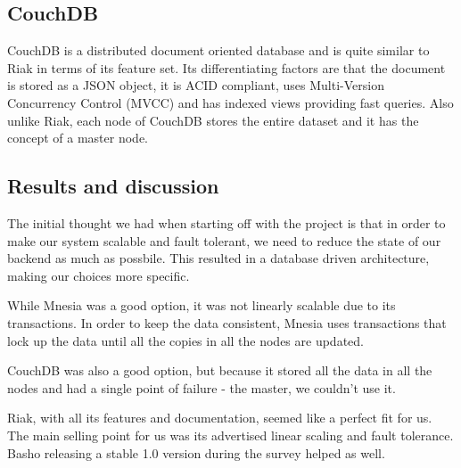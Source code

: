 \documentclass[11pt,a4paper]{report}
\begin{document}
\subsection{CouchDB}
CouchDB is a distributed document oriented database and is quite similar to Riak in terms of its feature set. Its differentiating factors are that the document is stored as a JSON object, it is ACID compliant, uses Multi-Version Concurrency Control (MVCC) and has indexed views providing fast queries. Also unlike Riak, each node of CouchDB stores the entire dataset and it has the concept of a master node.

\subsection{Results and discussion}
The initial thought we had when starting off with the project is that in order to make our system scalable and fault tolerant, we need to reduce the state of our backend as much as possbile. This resulted in a database driven architecture, making our choices more specific.

While Mnesia was a good option, it was not linearly scalable due to its transactions. In order to keep the data consistent, Mnesia uses transactions that lock up the data until all the copies in all the nodes are updated.

CouchDB was also a good option, but because it stored all the data in all the nodes and had a single point of failure - the master, we couldn't use it.

Riak, with all its features and documentation, seemed like a perfect fit for us. The main selling point for us was its advertised linear scaling and fault tolerance. Basho releasing a stable 1.0 version during the survey helped as well.

\renewcommand\bibname{References}


\end{document}
